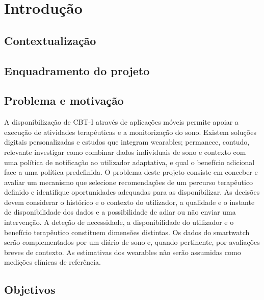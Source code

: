 % 
\chapter{Introdução} %
\label{chap:Chapter1} %

%
\section{Contextualização} 
\label{sec:chap1_context} %

\section{Enquadramento do projeto} 
\label{sec:chap1_enquadramento} %

\section{Problema e motivação} 
\label{sec:chap1_problem} %

A disponibilização de CBT-I através de aplicações móveis permite apoiar a execução de atividades terapêuticas e a monitorização do sono. Existem soluções digitais personalizadas e estudos que integram wearables; permanece, contudo, relevante investigar como combinar dados individuais de sono e contexto com uma política de notificação ao utilizador adaptativa, e qual o benefício adicional face a uma política predefinida.
O problema deste projeto consiste em conceber e avaliar um mecanismo que selecione recomendações de um percurso terapêutico definido e identifique oportunidades adequadas para as disponibilizar. As decisões devem considerar o histórico e o contexto do utilizador, a qualidade e o instante de disponibilidade dos dados e a possibilidade de adiar ou não enviar uma intervenção. A deteção de necessidade, a disponibilidade do utilizador e o benefício terapêutico constituem dimensões distintas.
Os dados do smartwatch serão complementados por um diário de sono e, quando pertinente, por avaliações breves de contexto. As estimativas dos wearables não serão assumidas como medições clínicas de referência.

\section{Objetivos} 
\label{sec:chap1_objectives} %

